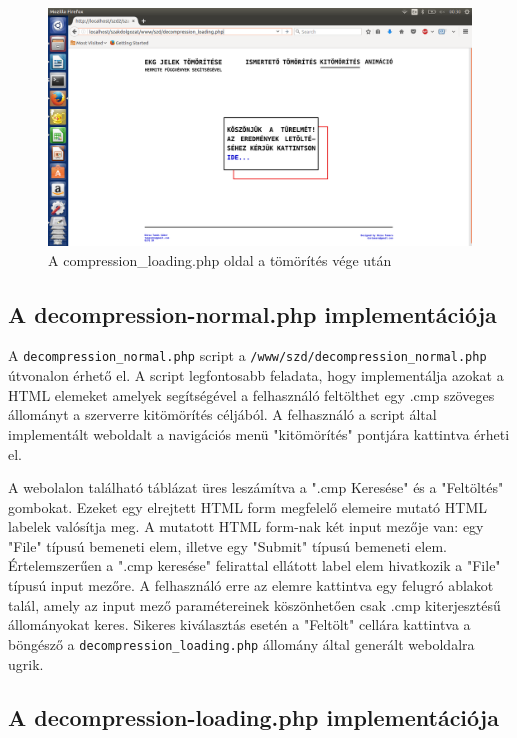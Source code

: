 \documentclass[oneside,titlepage,12pt,a4paper]{report}
\begin{document}
\begin{figure}[H]
\begin{center}
  \includegraphics[width=150mm]{./Abrak/WWW/comp_loading.png}
  \caption{A compression\_loading.php oldal a tömörítés vége után}
\end{center}
\end{figure}

\subsection{A decompression-normal.php implementációja}

A \texttt{decompression\_normal.php} script a \texttt{/www/szd/decompression\_normal.php} útvonalon érhető el. A script legfontosabb feladata, hogy implementálja azokat a HTML elemeket amelyek segítségével a felhasználó feltölthet egy .cmp szöveges állományt a szerverre kitömörítés céljából. A felhasználó a script által implementált weboldalt a navigációs menü "kitömörítés" pontjára kattintva érheti el. 
\par A webolalon található táblázat üres leszámítva a ".cmp Keresése" és a "Feltöltés" gombokat. Ezeket egy elrejtett HTML form megfelelő elemeire mutató HTML labelek valósítja meg. A mutatott HTML form-nak két input mezője van: egy "File" típusú bemeneti elem, illetve egy "Submit" típusú bemeneti elem. Értelemszerűen a ".cmp keresése" felirattal ellátott label elem hivatkozik a "File" típusú input mezőre. A felhasználó erre az elemre kattintva egy felugró ablakot talál, amely az input mező paramétereinek köszönhetően csak .cmp kiterjesztésű állományokat keres. Sikeres kiválasztás esetén a "Feltölt" cellára kattintva a böngésző a \texttt{decompression\_loading.php} állomány által generált weboldalra ugrik. 

\subsection{A decompression-loading.php implementációja}
\end{document}
